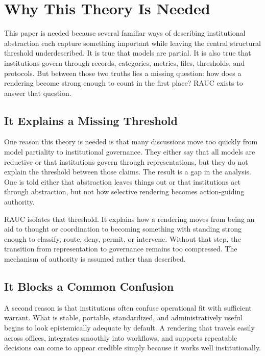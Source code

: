 \documentclass[11pt]{article}
\begin{document}
\section{Why This Theory Is Needed}

This paper is needed because several familiar ways of describing institutional abstraction each capture something important while leaving the central structural threshold underdescribed. It is true that models are partial. It is also true that institutions govern through records, categories, metrics, files, thresholds, and protocols. But between those two truths lies a missing question: how does a rendering become strong enough to count in the first place? RAUC exists to answer that question.

\subsection{It Explains a Missing Threshold}

One reason this theory is needed is that many discussions move too quickly from model partiality to institutional governance. They either say that all models are reductive or that institutions govern through representations, but they do not explain the threshold between those claims. The result is a gap in the analysis. One is told either that abstraction leaves things out or that institutions act through abstraction, but not how selective rendering becomes action-guiding authority.\cite{Swanson2026MediatedJudgmentConstraint}

RAUC isolates that threshold. It explains how a rendering moves from being an aid to thought or coordination to becoming something with standing strong enough to classify, route, deny, permit, or intervene. Without that step, the transition from representation to governance remains too compressed. The mechanism of authority is assumed rather than described.

\subsection{It Blocks a Common Confusion}

A second reason is that institutions often confuse operational fit with sufficient warrant. What is stable, portable, standardized, and administratively useful begins to look epistemically adequate by default. A rendering that travels easily across offices, integrates smoothly into workflows, and supports repeatable decisions can come to appear credible simply because it works well institutionally.\cite{Porter1995TrustInNumbers,EspelandStevens1998Commensuration,TimmermansEpstein2010WorldOfStandards}
\end{document}
